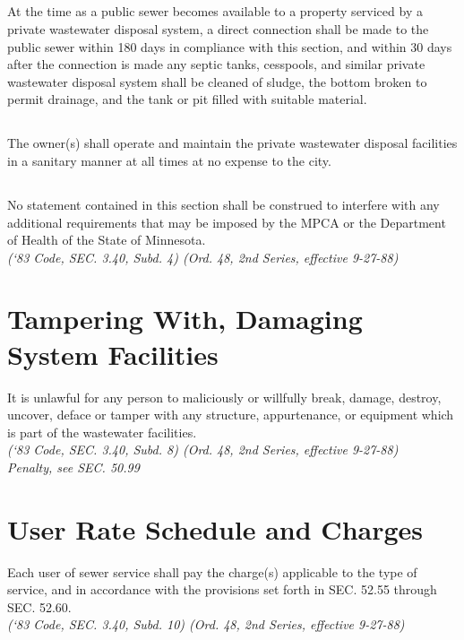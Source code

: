\subsection{}
At the time as a public sewer becomes available to a property serviced by a private wastewater disposal system, a direct connection shall be made to the public sewer within 180 days in compliance with this section, and within 30 days after the connection is made any septic tanks, cesspools, and similar private wastewater disposal system shall be cleaned of sludge, the bottom broken to permit drainage, and the tank or pit filled with suitable material.
\subsection{}
The owner(s) shall operate and maintain the private wastewater disposal facilities in a sanitary manner at all times at no expense to the city.
\subsection{}
No statement contained in this section shall be construed to interfere with any additional requirements that may be imposed by the MPCA or the Department of Health of the State of Minnesota.\\
\emph{(‘83 Code, SEC. 3.40, Subd. 4) (Ord. 48, 2nd Series, effective 9-27-88)}
\section{Tampering With, Damaging System Facilities}
It is unlawful for any person to maliciously or willfully break, damage, destroy, uncover, deface or tamper with any structure, appurtenance, or equipment which is part of the wastewater facilities.\\
\emph{(‘83 Code, SEC. 3.40, Subd. 8) (Ord. 48, 2nd Series, effective 9-27-88)}\\
\emph{Penalty, see SEC. 50.99}
\section{User Rate Schedule and Charges}
Each user of sewer service shall pay the charge(s) applicable to the type of service, and in accordance with the provisions set forth in SEC. 52.55 through SEC. 52.60.\\
\emph{(‘83 Code, SEC. 3.40, Subd. 10) (Ord. 48, 2nd Series, effective 9-27-88)}\\


